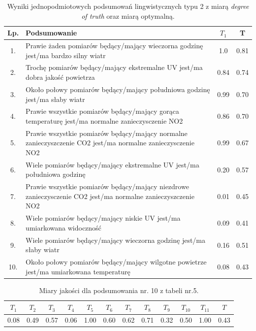 \documentclass{article}
\begin{document}
\begin{table}[H]
\begin{center}
\normalsize %
\begin{tabular}{|c|p{8cm}|c|c|} %
\hline
\textbf{Lp.} & \textbf{Podsumowanie} & \textbf{\(T_1\)} & \textbf{T} \\ \hline
1. & Prawie żaden pomiarów będący/mający wieczorna godzinę jest/ma bardzo silny wiatr & 1.0 & 0.81 \\ \hline
2. & Trochę pomiarów będący/mający ekstremalne UV jest/ma dobra jakość powietrza & 0.84 & 0.74 \\ \hline
3. & Około połowy pomiarów będący/mający południowa godzinę jest/ma słaby wiatr & 0.99 & 0.70 \\ \hline
4. & Prawie wszystkie pomiarów będący/mający gorąca temperaturę jest/ma normalne zanieczysczenie NO2 & 0.86 & 0.70 \\ \hline
5. & Prawie wszystkie pomiarów będący/mający normalne zanieczyszczenie CO2 jest/ma normalne zanieczysczenie NO2 & 0.99 & 0.67 \\ \hline
6. & Wiele pomiarów będący/mający ekstremalne UV jest/ma południowa godzinę & 0.20 & 0.57 \\ \hline
7. & Prawie wszystkie pomiarów będący/mający niezdrowe zanieczysczenie CO2 jest/ma normalne zanieczyszczenie NO2 & 0.01 & 0.45 \\ \hline
8. & Wiele pomiarów będący/mający niskie UV jest/ma umiarkowana widoczność & 0.09 & 0.41 \\ \hline
9. & Wiele pomiarów będący/mający wieczorna godzinę jest/ma słaby wiatr & 0.16 & 0.51 \\ \hline
10. & Około połowy pomiarów będący/mający wilgotne powietrze jest/ma umiarkowana temperaturę & 0.08 & 0.43 \\ \hline 
\end{tabular}
\caption{Wyniki jednopodmiotowych podsumowań lingwistycznych typu 2 z miarą \textit{degree of truth} oraz miarą optymalną.}
\end{center}
\end{table}


\begin{table}[H]
    \centering
    \begin{tabular}{|c|c|c|c|c|c|c|c|c|c|c|c|}
    \hline
    \textbf{\(T_1\)} &\textbf{\(T_2\)} & \textbf{\(T_3\)} & \textbf{\(T_4\)} & \textbf{\(T_5\)} & \textbf{\(T_6\)} & \textbf{\(T_7\)} & \textbf{\(T_8\)} & \textbf{\(T_9\)} & \textbf{\(T_{10}\)} & \textbf{\(T_{11}\)} & \textbf{\(T\)} \\ \hline
    0.08 & 0.49 & 0.57 & 0.06 & 1.00 & 0.60 & 0.62 & 0.71 & 0.32 & 0.50 & 1.00 & 0.43 \\ \hline
    \end{tabular}
    \caption{Miary jakości dla podsumowania nr. 10 z tabeli nr.5.}
\end{table}  
\end{document}
